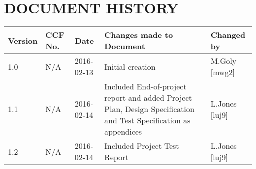 \documentclass{project}
\begin{document}
\section*{DOCUMENT HISTORY}
\begin{tabular}{|l | l | l | p{8cm} |l | }
\hline
Version & CCF No. & Date & Changes made to Document & Changed by \\
\hline
1.0 & N/A & 2016-02-13 & Initial creation & M.Goly [mwg2] \\
\hline
1.1 & N/A & 2016-02-14 & Included End-of-project report and added Project Plan, Design Specification and Test Specification as appendices & L.Jones [luj9] \\
\hline
1.2 & N/A & 2016-02-14 & Included Project Test Report & L.Jones [luj9] \\
\hline
\end{tabular}
\label{thelastpage}




\end{document}
